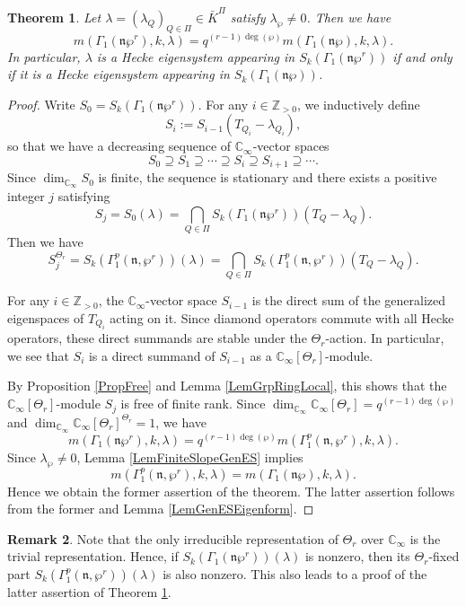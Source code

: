 \documentclass[11pt]{amsart}
\theoremstyle{plain}
\newtheorem{thm}{Theorem}[section]
\theoremstyle{definition}
\newtheorem{rmk}[thm]{Remark}
\newcommand{\bZ}{\mathbb{Z}}
\newcommand{\frn}{\mathfrak{n}}
\newcommand{\Cinf}{\mathbb{C}_{\infty}}
\begin{document}
\begin{thm}\label{ThmConstancy}
	Let $\lambda=(\lambda_Q)_{Q\in\Pi}\in \bar{K}^\Pi$ satisfy $\lambda_\wp\neq 0$. Then we have
	\[
	m(\Gamma_1(\frn\wp^r),k,\lambda)=q^{(r-1)\deg(\wp)}m(\Gamma_1(\frn\wp),k,\lambda).
	\]
	In particular, $\lambda$ is a Hecke eigensystem appearing in $S_k(\Gamma_1(\frn\wp^r))$ 
	if and only if it is a Hecke eigensystem appearing in $S_k(\Gamma_1(\frn\wp))$. 
\end{thm}
\begin{proof}
	Write $S_0=S_k(\Gamma_1(\frn\wp^r))$. 
	For any $i\in \bZ_{>0}$, we inductively define
	\[
	S_i:=S_{i-1}(T_{Q_i}-\lambda_{Q_i}),
	\]
	so that we have a decreasing sequence of $\Cinf$-vector spaces
	\[
	S_0\supseteq S_1\supseteq \cdots \supseteq S_i\supseteq S_{i+1}\supseteq \cdots.
	\]
	Since $\dim_{\Cinf}S_0$ is finite, the sequence is stationary and there exists a positive integer $j$ satisfying
	\[
	S_j=S_0(\lambda)=\bigcap_{Q\in \Pi} S_k(\Gamma_1(\frn\wp^r))(T_{Q}-\lambda_Q).
	\]
	Then we have
	\[
	S_j^{\Theta_r}=S_k(\Gamma_1^p(\frn,\wp^r))(\lambda)=\bigcap_{Q\in \Pi} S_k(\Gamma_1^p(\frn,\wp^r))(T_{Q}-\lambda_Q).
	\]
	
	For any $i\in \bZ_{>0}$, the $\Cinf$-vector space $S_{i-1}$ is the direct sum of the generalized eigenspaces of $T_{Q_{i}}$ acting on it.
	Since diamond operators commute with all Hecke operators, 
	these direct summands are stable under the $\Theta_r$-action. In particular,
	we see that $S_i$ is a direct summand of $S_{i-1}$ 
	as a $\Cinf[\Theta_r]$-module.
	
	By Proposition \ref{PropFree} and Lemma \ref{LemGrpRingLocal}, this shows that
	the $\Cinf[\Theta_r]$-module $S_j$ is free of finite rank. 
	Since $\dim_{\Cinf}\Cinf[\Theta_r]=q^{(r-1)\deg(\wp)}$ and $\dim_{\Cinf}\Cinf[\Theta_r]^{\Theta_r}=1$, we have
	\[
	m(\Gamma_1(\frn\wp^r),k,\lambda)=q^{(r-1)\deg(\wp)}m(\Gamma_1^p(\frn,\wp^r),k,\lambda).
	\]
	Since $\lambda_\wp\neq 0$, Lemma \ref{LemFiniteSlopeGenES} implies 
	\[
	m(\Gamma_1^p(\frn,\wp^r),k,\lambda)=m(\Gamma_1(\frn\wp),k,\lambda).
	\]
	Hence we obtain the former assertion of the theorem. The latter assertion follows from the former and Lemma \ref{LemGenESEigenform}.
\end{proof}

\begin{rmk}\label{RmkSkipFreeness}
	Note that the only irreducible representation of $\Theta_r$ over $
	\Cinf$ is the trivial representation. Hence, if $S_k(\Gamma_1(\frn\wp^r))(\lambda)$ is nonzero, then its $\Theta_r$-fixed part
	$S_k(\Gamma_1^p(\frn,\wp^r))(\lambda)$ is also nonzero. This also leads to a proof of the latter assertion of Theorem \ref{ThmConstancy}.  
\end{rmk}
\end{document}
